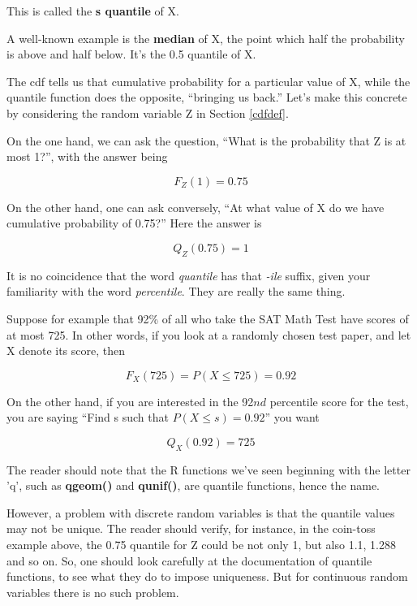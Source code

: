 This is called the {\bf s quantile} of X.

A well-known example is the {\bf median} of X, the point which half
the probability is above and half below.  It's the 0.5 quantile of X.

The cdf tells us that cumulative probability for a particular value of
X, while the quantile function does the opposite, ``bringing us back.''
Let's make this concrete by considering the random variable Z in Section
\ref{cdfdef}.

On the one hand, we can ask the question, ``What is the probability that
Z is at most 1?'', with the answer being

\begin{equation}
F_Z(1) = 0.75 
\end{equation}

On the other hand, one can ask conversely, ``At what value of X do we
have cumulative probability of 0.75?''  Here the answer is

\begin{equation}
Q_Z(0.75) = 1
\end{equation}

It is no coincidence that the word {\it quantile} has that 
{\it -ile} suffix, given your familiarity with the word {\it
percentile}.  They are really the same thing.

Suppose for example that 92\% of all who take the SAT Math Test have
scores of at most 725.  In other words, if you look at a randomly chosen
test paper, and let X denote its score, then

\begin{equation}
F_X(725) = P(X \leq 725) = 0.92
\end{equation}

On the other hand, if you are interested in the 92$nd$ percentile score
for the test, you are saying ``Find s such that $P(X \leq s) = 0.92$'' you
want

\begin{equation}
Q_X(0.92) = 725
\end{equation}

The reader should note that the R functions we've seen beginning with
the letter 'q', such as {\bf qgeom()} and {\bf qunif()}, are quantile
functions, hence the name.

However, a problem with discrete random variables is that the quantile
values may not be unique.  The reader should verify, for instance, in
the coin-toss example above, the 0.75 quantile for Z could be not only
1, but also 1.1, 1.288 and so on.  So, one should look carefully at the
documentation of quantile functions, to see what they do to impose
uniqueness.  But for continuous random variables there is no such
problem.

